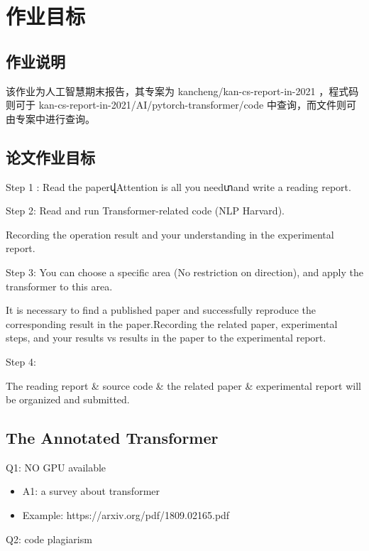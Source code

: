 \chapter{作业目标}
\label{chap:1}

\section{作业说明}

该作业为人工智慧期末报告，其专案为 kancheng/kan-cs-report-in-2021 ，程式码则可于 kan-cs-report-in-2021/AI/pytorch-transformer/code 中查询，而文件则可由专案中进行查询。

\section{论文作业目标}

Step 1 : Read the paperվAttention is all you needտand write a reading report. 

Step 2: Read and run Transformer-related code (NLP Harvard).

Recording the operation result and your understanding in the experimental report.

Step 3: You can choose a specific area (No restriction on direction), and apply the transformer to this area.

It is necessary to find a published paper and successfully reproduce the corresponding result in the paper.Recording the related paper, experimental steps, and your results vs results in the paper to the experimental report.

Step 4: 

The reading report \& source code \& the related paper \& experimental report will be organized and submitted. 


\section{The Annotated Transformer}


Q1: NO GPU available

\begin{itemize}
\item A1: a survey about transformer
\item Example: https://arxiv.org/pdf/1809.02165.pdf
\end{itemize}


Q2: code plagiarism

